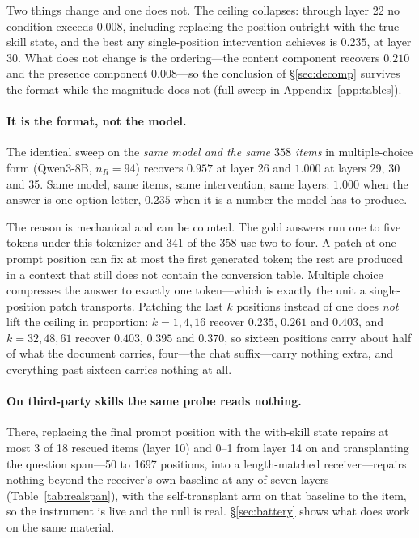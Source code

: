 \documentclass{article}
\begin{document}
Two things change and one does not. The ceiling collapses: through layer 22 no
condition exceeds $0.008$, including replacing the position outright with the
true skill state, and the best any single-position intervention achieves is
$0.235$, at layer 30. What does not change is the ordering---the content
component recovers $0.210$ and the presence component $0.008$---so the
conclusion of \S\ref{sec:decomp} survives the format while the magnitude does
not (full sweep in Appendix~\ref{app:tables}).

\paragraph{It is the format, not the model.} The identical sweep on the
\emph{same model and the same $358$ items} in multiple-choice form (Qwen3-8B,
$n_R=94$) recovers $0.957$ at layer 26 and $1.000$ at layers 29, 30 and 35.
Same model, same items, same intervention, same layers: $1.000$ when the answer
is one option letter, $0.235$ when it is a number the model has to produce.

The reason is mechanical and can be counted. The gold answers run one to five
tokens under this tokenizer and $341$ of the $358$ use two to four. A patch at
one prompt position can fix at most the first generated token; the rest are
produced in a context that still does not contain the conversion table.
Multiple choice compresses the answer to exactly one token---which is exactly
the unit a single-position patch transports. Patching the last $k$ positions
instead of one does \emph{not} lift the ceiling in proportion: $k=1,4,16$
recover $0.235$, $0.261$ and $0.403$, and $k=32,48,61$ recover $0.403$, $0.395$
and $0.370$, so sixteen positions carry about half of what the document carries,
four---the chat suffix---carry nothing extra, and everything past sixteen
carries nothing at all.

\paragraph{On third-party skills the same probe reads nothing.} There,
replacing the final prompt position with the with-skill state repairs at most 3
of 18 rescued items (layer 10) and 0--1 from layer 14 on and transplanting the question span---50 to 1697 positions, into a
length-matched receiver---repairs nothing beyond the receiver's own baseline at
any of seven layers (Table~\ref{tab:realspan}), with the self-transplant arm on
that baseline to the item, so the instrument is live and the null is real.
\S\ref{sec:battery} shows what does work on the same material.
\end{document}

